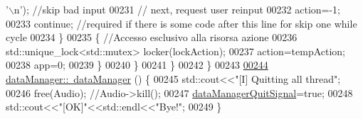 \begin{DoxyCode}
{      '\(\backslash\)n'}); \textcolor{comment}{//skip bad input}
00231                 \textcolor{comment}{// next, request user reinput}
00232                 action=-1;
00233                 \textcolor{keywordflow}{continue}; \textcolor{comment}{//required if there is some code after this line for
       skip one while cycle}
00234             \}
00235             \{ \textcolor{comment}{//Accesso esclusivo alla risorsa azione}
00236                 std::unique\_lock<std::mutex> locker(lockAction);
00237                 action=tempAction;
00238                 app=0;
00239             \}
00240         \}
00241     \}
00242 \}
00243 
\hypertarget{dataManagerHub_8cpp_source_l00244}{}\hyperlink{classdataManager_ac9e28e6a50c6ad489ca7376b89cc20cb}{00244} \hyperlink{classdataManager_ac9e28e6a50c6ad489ca7376b89cc20cb}{dataManager::~dataManager} () \{
00245     std::cout<<\textcolor{stringliteral}{"[I] Quitting all thread"};
00246     free(Audio); \textcolor{comment}{//Audio->kill();}
00247     \hyperlink{classdataManager_a76b9dba2dde86540f5f37f3b5840653e}{dataManagerQuitSignal}=\textcolor{keyword}{true};
00248     std::cout<<\textcolor{stringliteral}{"[OK]"}<<std::endl<<\textcolor{stringliteral}{"Bye!"};
00249 \}
\end{DoxyCode}
